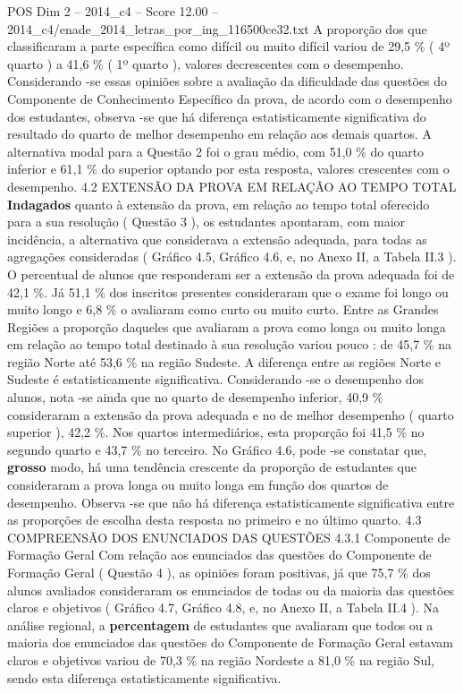 \begin{textsample}{POS Dim 2 – 2014\_c4 – Score 12.00 – 2014\_c4/enade\_2014\_letras\_por\_ing\_116500ce32.txt}
A proporção dos que classificaram a parte específica como difícil ou muito difícil variou de 29,5 \% ( 4º quarto ) a 41,6 \% ( 1º quarto ), valores decrescentes com o desempenho.
Considerando -se essas opiniões sobre a avaliação da dificuldade das questões do Componente de Conhecimento Específico da prova, de acordo com o desempenho dos estudantes, observa -se que há diferença estatisticamente significativa do resultado do quarto de melhor desempenho em relação aos demais quartos.
A alternativa modal para a Questão 2 foi o grau médio, com 51,0 \% do quarto inferior e 61,1 \% do superior optando por esta resposta, valores crescentes com o desempenho. 4.2 EXTENSÃO DA PROVA EM RELAÇÃO AO TEMPO TOTAL \textbf{Indagados} quanto à extensão da prova, em relação ao tempo total oferecido para a sua resolução ( Questão 3 ), os estudantes apontaram, com maior incidência, a alternativa que considerava a extensão adequada, para todas as agregações consideradas ( Gráfico 4.5, Gráfico 4.6, e, no Anexo II, a Tabela II.3 ).
O percentual de alunos que responderam ser a extensão da prova adequada foi de 42,1 \%.
Já 51,1 \% dos inscritos presentes consideraram que o exame foi longo ou muito longo e 6,8 \% o avaliaram como curto ou muito curto.
Entre as Grandes Regiões a proporção daqueles que avaliaram a prova como longa ou muito longa em relação ao tempo total destinado à sua resolução variou pouco : de 45,7 \% na região Norte até 53,6 \% na região Sudeste.
A diferença entre as regiões Norte e Sudeste é estatisticamente significativa.
Considerando -se o desempenho dos alunos, nota -se ainda que no quarto de desempenho inferior, 40,9 \% consideraram a extensão da prova adequada e no de melhor desempenho ( quarto superior ), 42,2 \%.
Nos quartos intermediários, esta proporção foi 41,5 \% no segundo quarto e 43,7 \% no terceiro.
No Gráfico 4.6, pode -se constatar que, \textbf{grosso} modo, há uma tendência crescente da proporção de estudantes que consideraram a prova longa ou muito longa em função dos quartos de desempenho.
Observa -se que não há diferença estatisticamente significativa entre as proporções de escolha desta resposta no primeiro e no último quarto. 4.3 COMPREENSÃO DOS ENUNCIADOS DAS QUESTÕES 4.3.1 Componente de Formação Geral Com relação aos enunciados das questões do Componente de Formação Geral ( Questão 4 ), as opiniões foram positivas, já que 75,7 \% dos alunos avaliados consideraram os enunciados de todas ou da maioria das questões claros e objetivos ( Gráfico 4.7, Gráfico 4.8, e, no Anexo II, a Tabela II.4 ).
Na análise regional, a \textbf{percentagem} de estudantes que avaliaram que todos ou a maioria dos enunciados das questões do Componente de Formação Geral estavam claros e objetivos variou de 70,3 \% na região Nordeste a 81,0 \% na região Sul, sendo esta diferença estatisticamente significativa.

\end{textsample}
